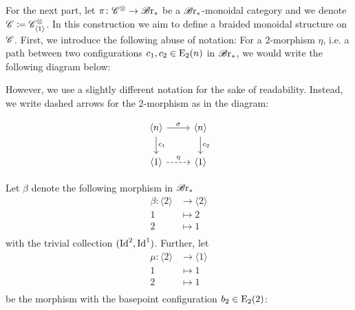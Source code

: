 \begin{const}\label{con:brx_monoidal} For the next part, let $\pi \colon
\mathscr{C}^{\otimes} \to \mathscr{B} \text{r}_{\ast}$ be a $\mathscr{B} \text{r}_{\ast}$-monoidal category and we denote $\mathscr{C} \coloneqq
\mathscr{C}^{\otimes}_{\langle 1 \rangle}$. In this construction we aim to define a braided
monoidal structure on $\mathscr{C}$. First, we introduce the following abuse of notation:
For a $2$-morphism $\eta$, i.e. a path between two configurations $c_1, c_2 \in
\operatorname{E}_2(n)$ in $\mathscr{B} \text{r}_{\ast}$, we would write the following diagram below:
\begin{center}
\end{center}

However, we use a slightly different notation for the sake of readability.
Instead, we write dashed arrows for the $2$-morphism as in the diagram:

\[    
    \begin{tikzcd}
        \langle n \rangle \arrow[r, "\sigma"] \arrow[d, "c_1"] & \langle n \rangle \arrow[d, "c_2"] \\
        \langle 1 \rangle  \arrow[r, dashed, "\eta"]                  & \langle 1 \rangle                
    \end{tikzcd}
\]


Let $\beta$ denote the following morphism in $\mathscr{B} \text{r}_{\ast}$
     \begin{align*}
         \beta \colon \langle 2 \rangle &\to \langle 2 \rangle \\
         1 &\mapsto 2 \\
         2 &\mapsto 1 \\
     \end{align*}
with the trivial collection $(\operatorname{Id}^2, \operatorname{Id}^1)$. Further, let 
\begin{align*}
    \mu \colon \langle 2 \rangle &\to \langle 1 \rangle \\
    1 &\mapsto 1 \\
    2 &\mapsto 1 \\
\end{align*}
be the morphism with the basepoint configuration $b_2 \in \operatorname{E}_2(2)$:
\begin{center}
\end{center}
\end{const}
